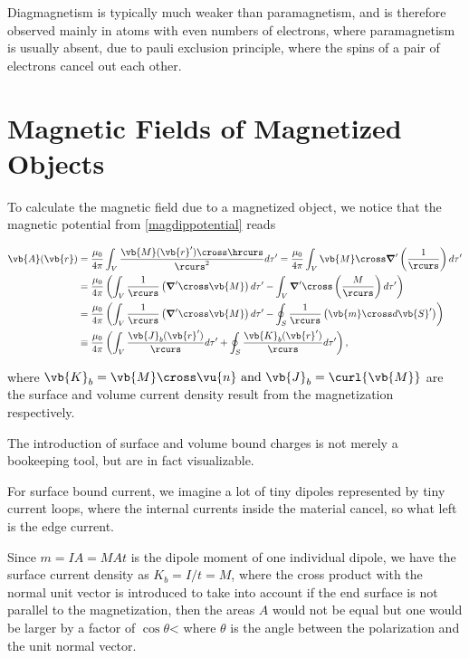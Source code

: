 \documentclass[english,a4paper,12pt]{report}
\begin{document}
Diagmagnetism is typically much weaker than paramagnetism, and is therefore observed mainly in atoms with even numbers of electrons, where paramagnetism is usually absent, due to pauli exclusion principle, where the spins of a pair of electrons cancel out each other. 



\section{Magnetic Fields of Magnetized Objects}

To calculate the magnetic field due to a magnetized object, we notice that the magnetic potential from \cref{magdippotential} reads

\begin{equation}
    \begin{aligned} 
    \vb{A} (\vb{r} ) &= \frac{\mu_0}{4\pi} \int_{V}^{} \frac{\vb{M} (\vb{r} ') \cross \hrcurs }{\rcurs ^2} d\tau' = \frac{\mu_0}{4\pi} \int_{V}^{} \vb{M} \cross  \boldsymbol{\nabla}' \left( \frac{1}{\rcurs }  \right) d\tau '  \\
    &= \frac{\mu_0}{4\pi} \left(\int_{V}^{} \frac{1}{\rcurs } \left( \boldsymbol{\nabla}' \cross \vb{M}  \right)d\tau ' - \int_{V}^{} \boldsymbol{\nabla}' \cross \left( \frac{M}{\rcurs }  \right)d\tau '  \right) \\
    &= \frac{\mu_0}{4\pi} \left( \int_{V}^{} \frac{1}{\rcurs } \left( \boldsymbol{\nabla}' \cross \vb{M}  \right)d\tau ' - \oint_{S} \frac{1}{\rcurs }\left( \vb{m} \cross d\vb{S} ' \right)  \right) \\   
    &\equiv \frac{\mu_0}{4\pi} \left( \int_{V}^{} \frac{\vb{J} _{b}(\vb{r} ') }{\rcurs } d\tau ' + \oint_{S} \frac{\vb{K} _{b}(\vb{r} ') }{\rcurs }d\tau '    \right),
\end{aligned} 
\end{equation}

where \(\vb{K} _{b} = \vb{M} \cross \vu{n}   \text { and } \vb{J} _{b} = \curl{\vb{M} }  \) are the surface and volume current density result from the magnetization respectively.

The introduction of surface and volume bound charges is not merely a bookeeping tool, but are in fact visualizable.

For surface bound current, we imagine a lot of tiny dipoles represented by tiny current loops, where the internal currents inside the material cancel, so what left is the edge current. 

Since \(m = IA = MAt\) is the dipole moment of one individual dipole, we have the surface current density as \(K_{b} = I /t = M  \), where the cross product with the normal unit vector is introduced to take into account if the end surface is not parallel to the magnetization, then the areas \(A\) would not be equal but one would be larger by a factor of \(\cos \theta \)< where \(\theta \) is the angle between the polarization and the unit normal vector.
\end{document}
